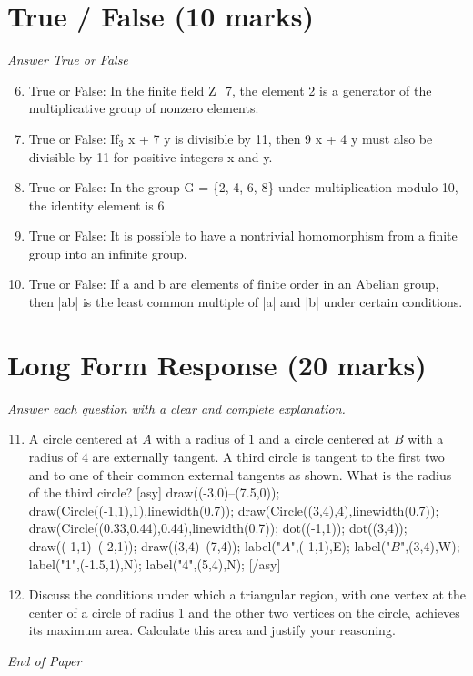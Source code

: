 \documentclass[12pt]{article}
\begin{document}
\section*{True / False (10 marks)}
\textit{Answer True or False}
\begin{enumerate}[label=\arabic*.]
\setcounter{enumi}{5}
\item True or False: In the finite field Z\_7, the element 2 is a generator of the multiplicative group of nonzero elements.
\item True or False: If$_{3}$ x + 7 y is divisible by 11, then 9 x + 4 y must also be divisible by 11 for positive integers x and y.
\item True or False: In the group G = \{2, 4, 6, 8\} under multiplication modulo 10, the identity element is 6.
\item True or False: It is possible to have a nontrivial homomorphism from a finite group into an infinite group.
\item True or False: If a and b are elements of finite order in an Abelian group, then |ab| is the least common multiple of |a| and |b| under certain conditions.
\end{enumerate}

\section*{Long Form Response (20 marks)}
\textit{Answer each question with a clear and complete explanation.}
\begin{enumerate}[label=\arabic*.]
\setcounter{enumi}{10}
\item A circle centered at $A$ with a radius of $1$ and a circle centered at $B$ with a radius of $4$ are externally tangent. A third circle is tangent to the first two and to one of their common external tangents as shown. What is the radius of the third circle? [asy] draw((-3,0)--(7.5,0)); draw(Circle((-1,1),1),linewidth(0.7)); draw(Circle((3,4),4),linewidth(0.7)); draw(Circle((0.33,0.44),0.44),linewidth(0.7)); dot((-1,1)); dot((3,4)); draw((-1,1)--(-2,1)); draw((3,4)--(7,4)); label("$A$",(-1,1),E); label("$B$",(3,4),W); label("1",(-1.5,1),N); label("4",(5,4),N); [/asy]
\item Discuss the conditions under which a triangular region, with one vertex at the center of a circle of radius 1 and the other two vertices on the circle, achieves its maximum area. Calculate this area and justify your reasoning.
\end{enumerate}

\vfill
\noindent\textit{End of Paper}
\end{document}
